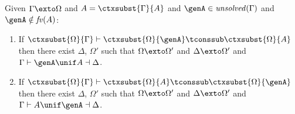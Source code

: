 \begin{mtheorem}  \label{thm:inst_complete}%
  Given $\Gamma \exto \Omega$ and $A = \ctxsubst{\Gamma}{A}$ and $\genA \in
  \mathit{unsolved}(\Gamma)$ and $\genA \notin \mathit{fv}(A)$:
  \begin{enumerate}
  \item If $\ctxsubst{\Omega}{\Gamma} \vdash \ctxsubst{\Omega}{\genA} \tconssub
    \ctxsubst{\Omega}{A}$ then there exist $\Delta$, $\Omega'$ such that $\Omega \exto
    \Omega'$ and $\Delta \exto \Omega'$ and $\Gamma \vdash \genA \unif A \dashv \Delta$.
  \item If $\ctxsubst{\Omega}{\Gamma} \vdash \ctxsubst{\Omega}{A} \tconssub
    \ctxsubst{\Omega}{\genA}$ then there exist $\Delta$, $\Omega'$ such that $\Omega \exto
    \Omega'$ and $\Delta \exto \Omega'$ and $\Gamma \vdash A \unif \genA \dashv \Delta$.
  \end{enumerate}
\end{mtheorem}
